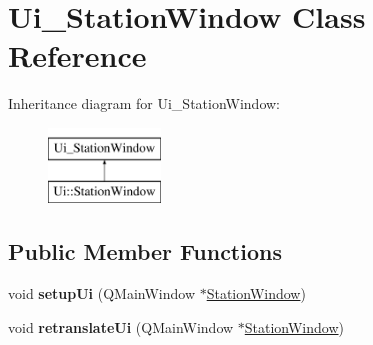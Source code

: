 \hypertarget{classUi__StationWindow}{}\section{Ui\+\_\+\+Station\+Window Class Reference}
\label{classUi__StationWindow}
Inheritance diagram for Ui\+\_\+\+Station\+Window\+:\begin{figure}[H]
\begin{center}
\leavevmode
\includegraphics[height=2.000000cm]{classUi__StationWindow}
\end{center}
\end{figure}
\subsection*{Public Member Functions}
\begin{DoxyCompactItemize}
\item 
\hypertarget{classUi__StationWindow_ad46fc9769c9f4f37f99b87af82ea59a8}{}void {\bfseries setup\+Ui} (Q\+Main\+Window $\ast$\hyperlink{classStationWindow}{Station\+Window})\label{classUi__StationWindow_ad46fc9769c9f4f37f99b87af82ea59a8}

\item 
\hypertarget{classUi__StationWindow_aafe239252f157bcab7e3812258c4c4d3}{}void {\bfseries retranslate\+Ui} (Q\+Main\+Window $\ast$\hyperlink{classStationWindow}{Station\+Window})\label{classUi__StationWindow_aafe239252f157bcab7e3812258c4c4d3}

\end{DoxyCompactItemize}
